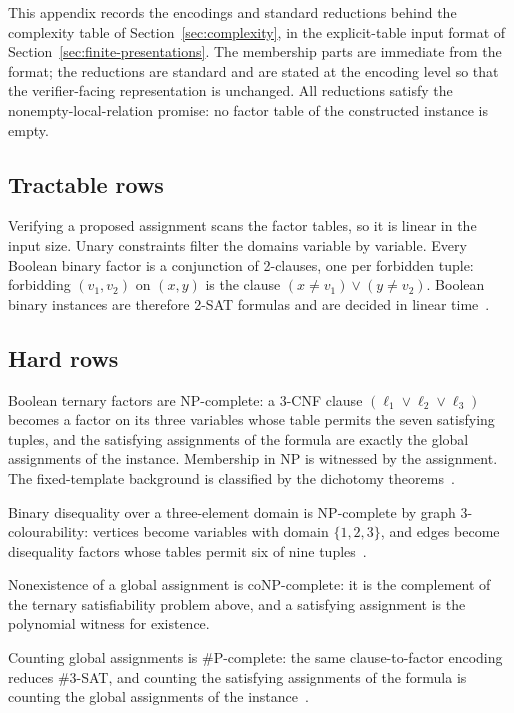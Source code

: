 \documentclass[11pt]{article}
\theoremstyle{plain}
\theoremstyle{definition}
\theoremstyle{remark}
\begin{document}
This appendix records the encodings and standard reductions behind the
complexity table of Section~\ref{sec:complexity}, in the explicit-table
input format of Section~\ref{sec:finite-presentations}.  The membership
parts are immediate from the format; the reductions are standard and are
stated at the encoding level so that the verifier-facing representation is
unchanged.  All reductions satisfy the nonempty-local-relation promise: no
factor table of the constructed instance is empty.

\subsection{Tractable rows}

Verifying a proposed assignment scans the factor tables, so it is linear in
the input size.  Unary constraints filter the domains variable by variable.
Every Boolean binary factor is a conjunction of 2-clauses, one per forbidden
tuple: forbidding \((v_1,v_2)\) on \((x,y)\) is the clause
\((x\ne v_1)\lor(y\ne v_2)\).  Boolean binary instances are therefore
2-SAT formulas and are decided in linear time~\cite{apt79}.

\subsection{Hard rows}

Boolean ternary factors are NP-complete: a 3-CNF clause
\((\ell_1\lor\ell_2\lor\ell_3)\) becomes a factor on its three variables
whose table permits the seven satisfying tuples, and the satisfying
assignments of the formula are exactly the global assignments of the
instance.  Membership in NP is witnessed by the assignment.  The
fixed-template background is classified by the dichotomy
theorems~\cite{schaefer78,zhuk17}.

Binary disequality over a three-element domain is NP-complete by graph
3-colourability: vertices become variables with domain \(\{1,2,3\}\), and
edges become disequality factors whose tables permit six of nine
tuples~\cite{gareyjohnson79}.

Nonexistence of a global assignment is coNP-complete: it is the complement
of the ternary satisfiability problem above, and a satisfying assignment is
the polynomial witness for existence.

Counting global assignments is \#P-complete: the same clause-to-factor
encoding reduces \#3-SAT, and counting the satisfying assignments of the
formula is counting the global assignments of the
instance~\cite{valiant79,creignou-hermann96}.
\end{document}
